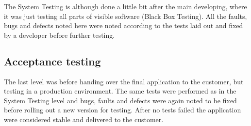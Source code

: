 The System Testing is although done a little bit after the main developing, where it was just testing all parts of visible software (Black Box Testing). All the faults, bugs and defects noted here were noted according to the tests laid out and fixed by a developer before further testing.
\subsection{Acceptance testing}
The last level was before handing over the final application to the customer, but testing in a production environment. The same tests were performed as in the System Testing level and bugs, faults and defects were again noted to be fixed before rolling out a new version for testing. After no tests failed the application were considered stable and delivered to the customer.


